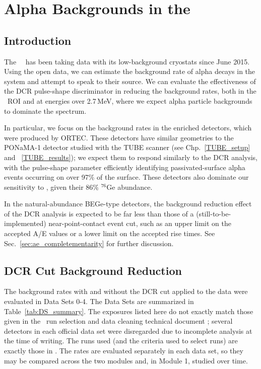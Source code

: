 
 
 
\chapter{Alpha Backgrounds in the \MJ\ \DEM\ }

\section{Introduction}
The \MJ\ \DEM\ has been taking data with its low-background cryostats since June 2015. Using the open data, we can estimate the background rate of alpha decays in the system and attempt to speak to their source. We can evaluate the effectiveness of the DCR pulse-shape discriminator in reducing the background rates, both in the \nonubb\ ROI and at energies over 2.7\,MeV, where we expect alpha particle backgrounds to dominate the spectrum. 

In particular, we focus on the background rates in the enriched detectors, which were produced by ORTEC. These detectors have similar geometries to the PONaMA-1 detector studied with the TUBE scanner (see Chp.~\ref{TUBE_setup} and ~\ref{TUBE_results}); we expect them to respond similarly to the DCR analysis, with the pulse-shape parameter efficiently identifying passivated-surface alpha events occurring on over 97\% of the surface. These detectors also dominate our sensitivity to \nonubb , given their 86\% $^{76}$Ge abundance. 

In the natural-abundance BEGe-type detectors, the background reduction effect of the DCR analysis is expected to be far less than those of a (still-to-be-implemented) near-point-contact event cut, such as an upper limit on the accepted A/E values or a lower limit on the accepted rise times. See Sec.~\ref{sec:ae_completementarity} for further discussion. 

\section{DCR Cut Background Reduction}
The background rates with and without the DCR cut applied to the data were evaluated in Data Sets 0-4. The Data Sets are summarized in Table~\ref{tab:DS_summary}. The exposures listed here do not exactly match those given in the \MJ\ run selection and data cleaning technical document \cite{MJ_runSel}; several detectors in each official data set were disregarded due to incomplete analysis at the time of writing. The runs used (and the criteria used to select runs) are exactly those in \cite{MJ_runSel}. The rates are evaluated separately in each data set, so they may be compared across the two modules and, in Module 1, studied over time. 

